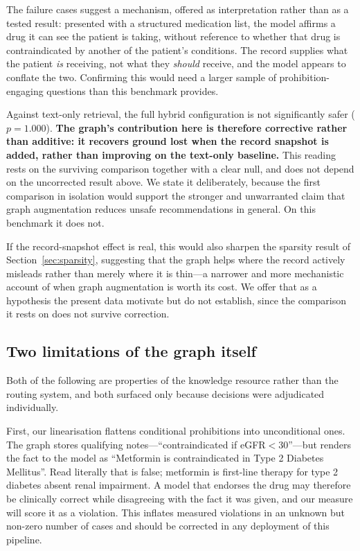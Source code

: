 The failure cases suggest a mechanism, offered as interpretation rather than
as a tested result: presented with a structured medication list, the model
affirms a drug it can see the patient is taking, without reference to whether
that drug is contraindicated by another of the patient's conditions. The
record supplies what the patient \emph{is} receiving, not what they
\emph{should} receive, and the model appears to conflate the two. Confirming
this would need a larger sample of prohibition-engaging questions than this
benchmark provides.

Against text-only retrieval, the full hybrid configuration is not
significantly safer ($p = 1.000$). \textbf{The graph's contribution here is
therefore corrective rather than additive: it recovers ground lost when the
record snapshot is added, rather than improving on the text-only baseline.}
This reading rests on the surviving comparison together with a clear null, and
does not depend on the uncorrected result above. We state it deliberately,
because the first comparison in isolation would support the stronger and
unwarranted claim that graph augmentation reduces unsafe recommendations in
general. On this benchmark it does not.

If the record-snapshot effect is real, this would also sharpen the sparsity result of
Section~\ref{sec:sparsity}, suggesting that the graph helps where the record actively misleads
rather than merely where it is thin---a narrower and more mechanistic account
of when graph augmentation is worth its cost. We offer that as a hypothesis
the present data motivate but do not establish, since the comparison it rests
on does not survive correction.

\subsection{Two limitations of the graph itself}

Both of the following are properties of the knowledge resource rather than the
routing system, and both surfaced only because decisions were adjudicated
individually.

First, our linearisation flattens conditional prohibitions into unconditional
ones. The graph stores qualifying notes---``contraindicated if
eGFR${<}30$''---but renders the fact to the model as ``Metformin is
contraindicated in Type 2 Diabetes Mellitus''. Read literally that is false;
metformin is first-line therapy for type 2 diabetes absent renal impairment. A
model that endorses the drug may therefore be clinically correct while
disagreeing with the fact it was given, and our measure will score it as a
violation. This inflates measured violations in an unknown but non-zero number
of cases and should be corrected in any deployment of this pipeline.

